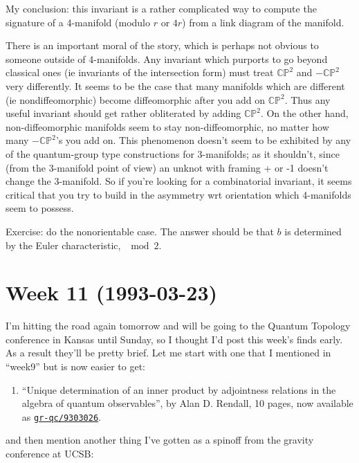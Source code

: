 \documentclass{article}
\def\tightlist{}
\begin{document}
My conclusion: this invariant is a rather complicated way to compute the
signature of a 4-manifold (modulo \(r\) or \(4r\)) from a link diagram
of the manifold.

There is an important moral of the story, which is perhaps not obvious
to someone outside of 4-manifolds. Any invariant which purports to go
beyond classical ones (ie invariants of the intersection form) must
treat \(\mathbb{CP}^2\) and \(-\mathbb{CP}^2\) very differently. It
seems to be the case that many manifolds which are different (ie
nondiffeomorphic) become diffeomorphic after you add on
\(\mathbb{CP}^2\). Thus any useful invariant should get rather
obliterated by adding \(\mathbb{CP}^2\). On the other hand,
non-diffeomorphic manifolds seem to stay non-diffeomorphic, no matter
how many \(-\mathbb{CP}^2\)'s you add on. This phenomenon doesn't seem
to be exhibited by any of the quantum-group type constructions for
3-manifolds; as it shouldn't, since (from the 3-manifold point of view)
an unknot with framing + or -1 doesn't change the 3-manifold. So if
you're looking for a combinatorial invariant, it seems critical that you
try to build in the asymmetry wrt orientation which 4-manifolds seem to
possess.

Exercise: do the nonorientable case. The answer should be that \(b\) is
determined by the Euler characteristic, \(\mod 2\).
\hypertarget{week-11-1993-03-23}{%
\section{Week 11 (1993-03-23)}\label{week-11-1993-03-23}}

I'm hitting the road again tomorrow and will be going to the Quantum
Topology conference in Kansas until Sunday, so I thought I'd post this
week's finds early. As a result they'll be pretty brief. Let me start
with one that I mentioned in ``week9'' but is now easier to get:

\begin{enumerate}
\def\labelenumi{\arabic{enumi})}
\tightlist
\item
  ``Unique determination of an inner product by adjointness relations in
  the algebra of quantum observables'', by Alan D. Rendall, 10 pages,
  now available as
  \href{http://xxx.lanl.gov/abs/gr-qc/9303026}{\texttt{gr-qc/9303026}}.
\end{enumerate}

and then mention another thing I've gotten as a spinoff from the gravity
conference at UCSB:
\end{document}
